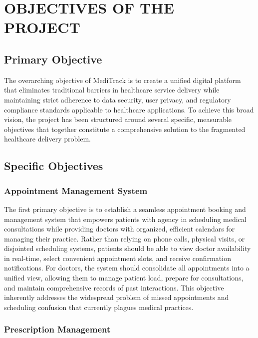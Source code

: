 \documentclass[12pt,a4paper]{report}
\begin{document}
\section{OBJECTIVES OF THE PROJECT}

\subsection{Primary Objective}

The overarching objective of MediTrack is to create a unified digital platform that eliminates traditional barriers in healthcare service delivery while maintaining strict adherence to data security, user privacy, and regulatory compliance standards applicable to healthcare applications. To achieve this broad vision, the project has been structured around several specific, measurable objectives that together constitute a comprehensive solution to the fragmented healthcare delivery problem.

\subsection{Specific Objectives}

\subsubsection{Appointment Management System}

The first primary objective is to establish a seamless appointment booking and management system that empowers patients with agency in scheduling medical consultations while providing doctors with organized, efficient calendars for managing their practice. Rather than relying on phone calls, physical visits, or disjointed scheduling systems, patients should be able to view doctor availability in real-time, select convenient appointment slots, and receive confirmation notifications. For doctors, the system should consolidate all appointments into a unified view, allowing them to manage patient load, prepare for consultations, and maintain comprehensive records of past interactions. This objective inherently addresses the widespread problem of missed appointments and scheduling confusion that currently plagues medical practices.

\subsubsection{Prescription Management}
\end{document}
